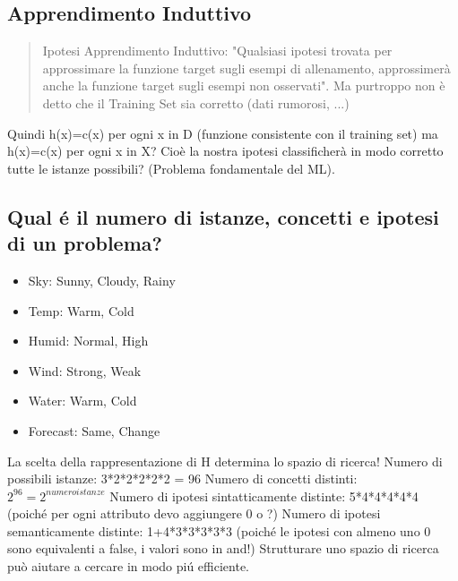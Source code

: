 \documentclass{article}
\begin{document}
\subsection{Apprendimento Induttivo}
\begin{quote}
    Ipotesi Apprendimento Induttivo: "Qualsiasi ipotesi trovata per approssimare la funzione target sugli esempi di allenamento, approssimerà anche la funzione target sugli esempi non osservati". Ma purtroppo non è detto che il Training Set sia corretto (dati rumorosi, ...)
\end{quote}
Quindi h(x)=c(x) per ogni x in D (funzione consistente con il training set) ma h(x)=c(x) per ogni x in X? Cioè la nostra ipotesi classificherà in modo corretto tutte le istanze possibili? (Problema fondamentale del ML).

\subsection{Qual é il numero di istanze, concetti e ipotesi di un problema?}
\begin{itemize}
    \item Sky: Sunny, Cloudy, Rainy
    \item Temp: Warm, Cold
    \item Humid: Normal, High
    \item Wind: Strong, Weak
    \item Water: Warm, Cold
    \item Forecast: Same, Change
\end{itemize}
La scelta della rappresentazione di H determina lo spazio di ricerca! \newline
Numero di possibili istanze: 3*2*2*2*2*2 = 96 \newline
Numero di concetti distinti: $2^{96} = 2^{numeroistanze}$ \newline
Numero di ipotesi sintatticamente distinte: 5*4*4*4*4*4 (poiché per ogni attributo devo aggiungere 0 o ?) \newline
Numero di ipotesi semanticamente distinte: 1+4*3*3*3*3*3 (poiché le ipotesi con almeno uno 0 sono equivalenti a false, i valori sono in and!) \newline
Strutturare uno spazio di ricerca può aiutare a cercare in modo piú efficiente.
\end{document}
